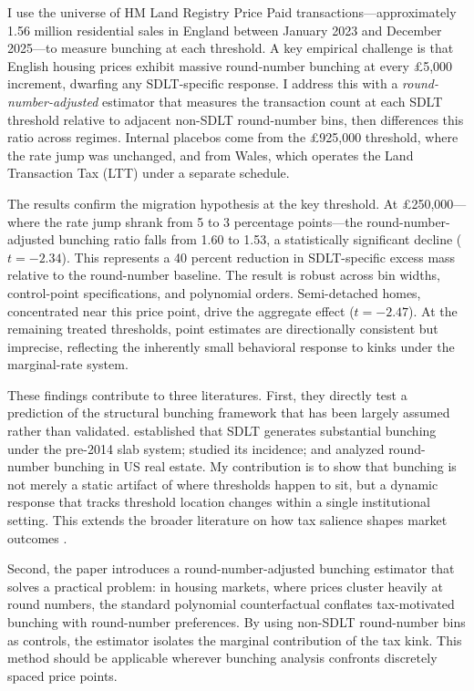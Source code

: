 \documentclass[12pt]{article}
\begin{document}
I use the universe of HM Land Registry Price Paid transactions---approximately 1.56 million residential sales in England between January 2023 and December 2025---to measure bunching at each threshold. A key empirical challenge is that English housing prices exhibit massive round-number bunching at every \pounds 5,000 increment, dwarfing any SDLT-specific response. I address this with a \textit{round-number-adjusted} estimator that measures the transaction count at each SDLT threshold relative to adjacent non-SDLT round-number bins, then differences this ratio across regimes. Internal placebos come from the \pounds 925,000 threshold, where the rate jump was unchanged, and from Wales, which operates the Land Transaction Tax (LTT) under a separate schedule.

The results confirm the migration hypothesis at the key threshold. At \pounds 250,000---where the rate jump shrank from 5 to 3 percentage points---the round-number-adjusted bunching ratio falls from 1.60 to 1.53, a statistically significant decline ($t = -2.34$). This represents a 40 percent reduction in SDLT-specific excess mass relative to the round-number baseline. The result is robust across bin widths, control-point specifications, and polynomial orders. Semi-detached homes, concentrated near this price point, drive the aggregate effect ($t = -2.47$). At the remaining treated thresholds, point estimates are directionally consistent but imprecise, reflecting the inherently small behavioral response to kinks under the marginal-rate system.

These findings contribute to three literatures. First, they directly test a prediction of the structural bunching framework that has been largely assumed rather than validated. \citet{best2018housing} established that SDLT generates substantial bunching under the pre-2014 slab system; \citet{besley2014incidence} studied its incidence; and \citet{kopczuk2016tax} analyzed round-number bunching in US real estate. My contribution is to show that bunching is not merely a static artifact of where thresholds happen to sit, but a dynamic response that tracks threshold location changes within a single institutional setting. This extends the broader literature on how tax salience shapes market outcomes \citep{chetty2009salience, slemrod2013tax}.

Second, the paper introduces a round-number-adjusted bunching estimator that solves a practical problem: in housing markets, where prices cluster heavily at round numbers, the standard polynomial counterfactual conflates tax-motivated bunching with round-number preferences. By using non-SDLT round-number bins as controls, the estimator isolates the marginal contribution of the tax kink. This method should be applicable wherever bunching analysis confronts discretely spaced price points.
\end{document}
